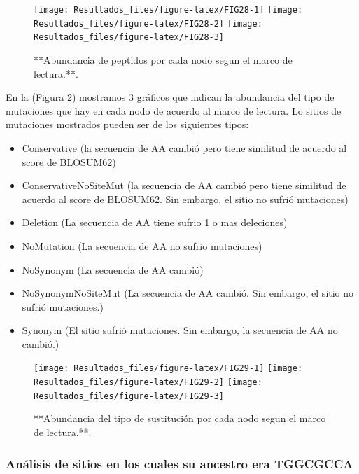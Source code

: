 \documentclass[
]{book}
\providecommand{\tightlist}{%
  \setlength{\itemsep}{0pt}\setlength{\parskip}{0pt}}
\begin{document}
\begin{figure}

{\centering \texttt{[image: Resultados\_files/figure-latex/FIG28-1]} \texttt{[image: Resultados\_files/figure-latex/FIG28-2]} \texttt{[image: Resultados\_files/figure-latex/FIG28-3]} 

}

\caption{**Abundancia de peptidos por cada nodo segun el marco de lectura.**.}\label{fig:FIG28}
\end{figure}

En la (Figura \ref{fig:FIG29}) mostramos 3 gráficos que indican la abundancia del tipo de mutaciones que hay en cada nodo de acuerdo al marco de lectura. Lo sitios de mutaciones mostrados pueden ser de los siguientes tipos:

\begin{itemize}
\tightlist
\item
  Conservative (la secuencia de AA cambió pero tiene similitud de acuerdo al score de BLOSUM62)
\item
  ConservativeNoSiteMut (la secuencia de AA cambió pero tiene similitud de acuerdo al score de BLOSUM62. Sin embargo, el sitio no sufrió mutaciones)
\item
  Deletion (La secuencia de AA tiene sufrio 1 o mas deleciones)
\item
  NoMutation (La secuencia de AA no sufrio mutaciones)
\item
  NoSynonym (La secuencia de AA cambió)
\item
  NoSynonymNoSiteMut (La secuencia de AA cambió. Sin embargo, el sitio no sufrió mutaciones.)
\item
  Synonym (El sitio sufrió mutaciones. Sin embargo, la secuencia de AA no cambió.)
\end{itemize}

\begin{figure}

{\centering \texttt{[image: Resultados\_files/figure-latex/FIG29-1]} \texttt{[image: Resultados\_files/figure-latex/FIG29-2]} \texttt{[image: Resultados\_files/figure-latex/FIG29-3]} 

}

\caption{**Abundancia del tipo de sustitución por cada nodo segun el marco de lectura.**.}\label{fig:FIG29}
\end{figure}

\hypertarget{anuxe1lisis-de-sitios-en-los-cuales-su-ancestro-era-tggcgcca}{%
\subsubsection{Análisis de sitios en los cuales su ancestro era TGGCGCCA}\label{anuxe1lisis-de-sitios-en-los-cuales-su-ancestro-era-tggcgcca}}
\end{document}
